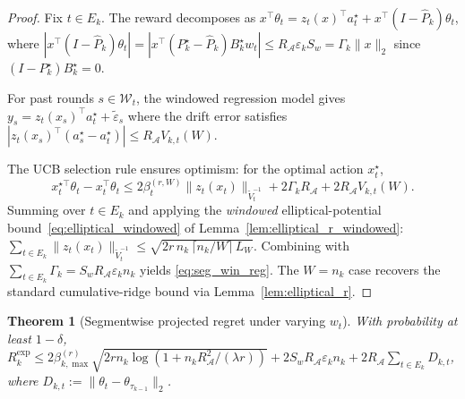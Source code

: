 \documentclass[11pt]{article}
\newcommand{\cA}{\mathcal{A}}
\newtheorem{theorem}{Theorem}
\begin{document}
\begin{proof}
Fix $t\in E_k$.  The reward decomposes as
$x^\top\theta_t = z_t(x)^\top a_t^\star + x^\top(I-\widehat{P}_k)\theta_t$,
where
$|x^\top(I-\widehat{P}_k)\theta_t|
= |x^\top(P_k^\star-\widehat{P}_k)B_k^\star w_t|
\le R_{\cA}\varepsilon_k S_w = \Gamma_k\|x\|_2$
since $(I-P_k^\star)B_k^\star=0$.

For past rounds $s\in\mathcal{W}_t$, the windowed regression model gives
$y_s = z_t(x_s)^\top a_t^\star + \tilde\varepsilon_s$ where the drift error
satisfies $|z_t(x_s)^\top(a_s^\star-a_t^\star)|\le R_{\cA}V_{k,t}(W)$.

The UCB selection rule ensures optimism: for the optimal action $x_t^\star$,
\[
x_t^{\star\top}\theta_t - x_t^\top\theta_t
\le 2\beta_t^{(r,W)}\|z_t(x_t)\|_{\widetilde{V}_t^{-1}}
+ 2\Gamma_kR_{\cA} + 2R_{\cA}V_{k,t}(W).
\]
Summing over $t\in E_k$ and applying the \emph{windowed} elliptical-potential
bound~\eqref{eq:elliptical_windowed} of
Lemma~\ref{lem:elliptical_r_windowed}:
$\sum_{t\in E_k}\|z_t(x_t)\|_{\widetilde V_t^{-1}}
\le\sqrt{2r\,n_k\,\lceil n_k/W\rceil\,L_W}$.
Combining with $\sum_{t\in E_k}\Gamma_k = S_wR_{\cA}\varepsilon_kn_k$ yields
\eqref{eq:seg_win_reg}.  The $W=n_k$ case recovers the standard cumulative-ridge
bound via Lemma~\ref{lem:elliptical_r}.
\end{proof}

\begin{theorem}[Segmentwise projected regret under varying $w_t$]
\label{thm:segment_projected_varying}
With probability at least $1-\delta$,
$R_k^{\mathrm{exp}} \le 2\beta_{k,\max}^{(r)} \sqrt{2rn_k\log(1+n_kR_{\cA}^2/(\lambda r))} + 2S_wR_{\cA}\varepsilon_k n_k + 2R_{\cA} \sum_{t\in E_k} D_{k,t}$,
where $D_{k,t} := \|\theta_t - \theta_{\tau_{k-1}}\|_2$.
\end{theorem}
\end{document}

